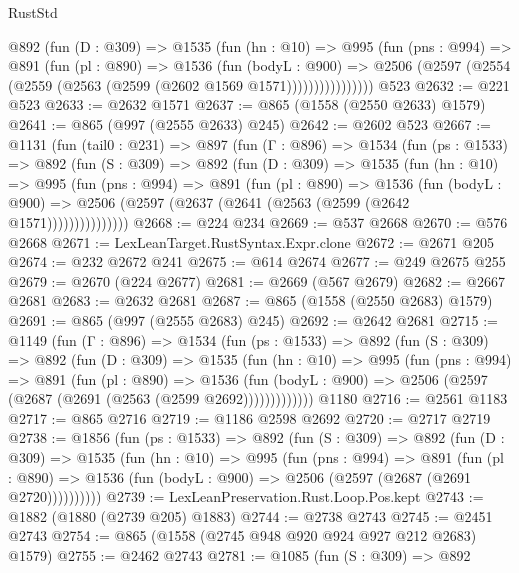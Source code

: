 \begin{lexlean}{RustStd}
\begin{coremodule}
            @892
              (fun (D : @309) =>
              @1535
                (fun (hn : @10) =>
                @995
                  (fun (pns : @994) =>
                  @891
                    (fun (pl : @890) =>
                    @1536
                      (fun (bodyL : @900) =>
                      @2506 (@2597 (@2554 (@2559 (@2563 (@2599 (@2602 @1569 @1571))))))))))))))))
    @523
@2632 := @221 @523
@2633 := @2632 @1571
@2637 := @865 (@1558 (@2550 @2633) @1579)
@2641 := @865 (@997 (@2555 @2633) @245)
@2642 := @2602 @523
@2667 := @1131
    (fun (tail0 : @231) =>
    @897
      (fun (Γ : @896) =>
      @1534
        (fun (ps : @1533) =>
        @892
          (fun (S : @309) =>
          @892
            (fun (D : @309) =>
            @1535
              (fun (hn : @10) =>
              @995
                (fun (pns : @994) =>
                @891
                  (fun (pl : @890) =>
                  @1536
                    (fun (bodyL : @900) =>
                    @2506 (@2597 (@2637 (@2641 (@2563 (@2599 (@2642 @1571)))))))))))))))
@2668 := @224 @234
@2669 := @537 @2668
@2670 := @576 @2668
@2671 := LexLeanTarget.RustSyntax.Expr.clone
@2672 := @2671 @205
@2674 := @232 @2672 @241
@2675 := @614 @2674
@2677 := @249 @2675 @255
@2679 := @2670 (@224 @2677)
@2681 := @2669 (@567 @2679)
@2682 := @2667 @2681
@2683 := @2632 @2681
@2687 := @865 (@1558 (@2550 @2683) @1579)
@2691 := @865 (@997 (@2555 @2683) @245)
@2692 := @2642 @2681
@2715 := @1149
    (fun (Γ : @896) =>
    @1534
      (fun (ps : @1533) =>
      @892
        (fun (S : @309) =>
        @892
          (fun (D : @309) =>
          @1535
            (fun (hn : @10) =>
            @995
              (fun (pns : @994) =>
              @891
                (fun (pl : @890) =>
                @1536
                  (fun (bodyL : @900) => @2506 (@2597 (@2687 (@2691 (@2563 (@2599 @2692)))))))))))))
    @1180
@2716 := @2561 @1183
@2717 := @865 @2716
@2719 := @1186 @2598 @2692
@2720 := @2717 @2719
@2738 := @1856
    (fun (ps : @1533) =>
    @892
      (fun (S : @309) =>
      @892
        (fun (D : @309) =>
        @1535
          (fun (hn : @10) =>
          @995
            (fun (pns : @994) =>
            @891
              (fun (pl : @890) =>
              @1536 (fun (bodyL : @900) => @2506 (@2597 (@2687 (@2691 @2720))))))))))
@2739 := LexLeanPreservation.Rust.Loop.Pos.kept
@2743 := @1882 (@1880 (@2739 @205) @1883)
@2744 := @2738 @2743
@2745 := @2451 @2743
@2754 := @865 (@1558 (@2745 @948 @920 @924 @927 @212 @2683) @1579)
@2755 := @2462 @2743
@2781 := @1085
    (fun (S : @309) =>
    @892

\end{coremodule}
\end{lexlean}
